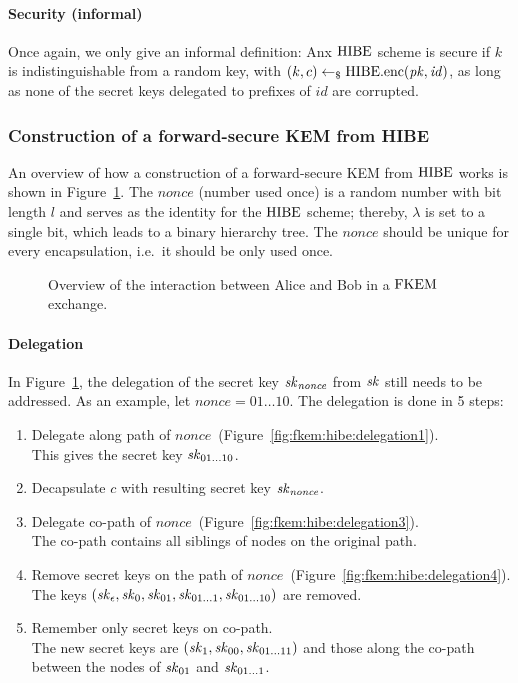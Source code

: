 \paragraph{Security (informal)} Once again, we only give an informal definition:
Anx $\mathrm{HIBE}$ scheme is secure if $k$ is indistinguishable from a random key, with $(k,c)\gets_\$\mathrm{HIBE}.\mathrm{enc}(\mathit{pk},\mathit{id})$, as long as none of the secret keys delegated to prefixes of $\mathit{id}$ are corrupted.

\subsubsection{Construction of a forward-secure KEM from HIBE}

An overview of how a construction of a forward-secure KEM from $\mathrm{HIBE}$ works is shown in Figure~\ref{fig:fkem:hibe:interaction}.
The $\mathit{nonce}$ (number used once) is a random number with bit length $l$ and serves as the identity for the $\mathrm{HIBE}$ scheme;
thereby, $\lambda$ is set to a single bit, which leads to a binary hierarchy tree.
The $\mathit{nonce}$ should be unique for every encapsulation, i.e.\ it should be only used once.

\begin{figure}[!ht]
    \centering
    
    \caption{Overview of the interaction between Alice and Bob in a $\mathrm{FKEM}$ exchange.}
    \label{fig:fkem:hibe:interaction}
\end{figure}

\paragraph{Delegation} In Figure~\ref{fig:fkem:hibe:interaction}, the delegation of the secret key $\mathit{sk}_{\mathit{nonce}}$ from $\mathit{sk}$ still needs to be addressed.
As an example, let $\mathit{nonce}=01\dots10$. The delegation is done in 5 steps:
\begin{enumerate}
    \item Delegate along path of $\mathit{nonce}$~(Figure~\ref{fig:fkem:hibe:delegation1}).\\
        This gives the secret key $\mathit{sk}_{01\dots10}$.
    \item Decapsulate $c$ with resulting secret key $\mathit{sk}_{\mathit{nonce}}$.
    \item Delegate co-path of $\mathit{nonce}$~(Figure~\ref{fig:fkem:hibe:delegation3}).\\
        The co-path contains all siblings of nodes on the original path.
    \item Remove secret keys on the path of $\mathit{nonce}$~(Figure~\ref{fig:fkem:hibe:delegation4}).\\
        The keys $(\mathit{sk}_\epsilon,\mathit{sk}_0,\mathit{sk}_{01},\mathit{sk}_{01\dots1},\mathit{sk}_{01\dots10})$ are removed.
    \item Remember only secret keys on co-path.\\
        The new secret keys are $(\mathit{sk}_1,\mathit{sk}_{00},\mathit{sk}_{01\dots11})$ and those along the co-path between the nodes of $\mathit{sk}_{01}$ and $\mathit{sk}_{01\dots1}$.
\end{enumerate}

